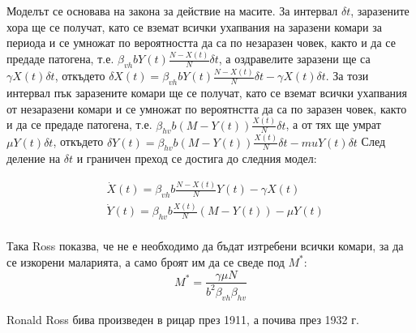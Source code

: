 Моделът се основава на закона за действие на масите.
За интервал $\delta t$, заразените хора ще се получат, като се вземат всички ухапвания на заразени комари за периода и се умножат по вероятността да са по незаразен човек, както и да се предаде патогена, т.е. $\beta_{vh} b Y(t) \frac{N-X(t)}{N} \delta t$, а оздравелите заразени ще са $\gamma X(t) \delta t$, откъдето $\delta X(t) = \beta_{vh} b Y(t) \frac{N-X(t)}{N} \delta t - \gamma X(t) \delta t$.
За този интервал пък заразените комари ще се получат, като се вземат всички ухапвания от незаразени комари и се умножат по вероятнстта да са по заразен човек, както и да се предаде патогена, т.е. $\beta_{hv} b (M - Y(t)) \frac{X(t)}{N} \delta t$, а от тях ще умрат $\mu Y(t) \delta t$, откъдето $\delta Y(t) = \beta_{hv} b (M - Y(t)) \frac{X(t)}{N} \delta t - mu Y(t) \delta t$ След деление на $\delta t$ и граничен преход се достига до следния модел:

\begin{equation}
  \label{eq:BasicProblem}
  \begin{split}
    &\dot{X}(t) = \beta_{vh} b \frac{N-X(t)}{N} Y(t) - \gamma X(t) \\
    &\dot{Y}(t) = \beta_{hv} b \frac{X(t)}{N} (M-Y(t)) - \mu Y(t) \\
  \end{split}
\end{equation}

Така Ross показва, че не е необходимо да бъдат изтребени всички комари, за да се изкорени маларията, а само броят им да се сведе под $M^*$:
\begin{equation}
  \label{eq:RossM}
  M^* = \frac{\gamma \mu N}{b^2 \beta_{vh} \beta_{hv}}
\end{equation}

Ronald Ross бива произведен в рицар през 1911, а почива през 1932 г.

